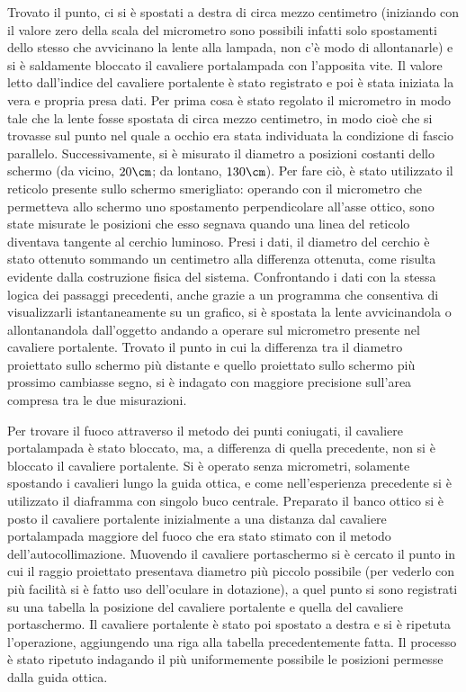 Trovato il punto, ci si è spostati a destra di circa mezzo centimetro (iniziando con il valore zero della scala del micrometro sono possibili infatti solo spostamenti dello stesso che avvicinano la lente alla lampada, non c'è modo di allontanarle) e si è saldamente bloccato il cavaliere portalampada con l'apposita vite. Il valore letto dall'indice del cavaliere portalente è stato registrato e poi è stata iniziata la vera e propria presa dati. Per prima cosa è stato regolato il micrometro in modo tale che la lente fosse spostata di circa mezzo centimetro, in modo cioè che si trovasse sul punto nel quale a occhio era stata individuata la condizione di fascio parallelo. Successivamente, si è misurato il diametro a posizioni costanti dello schermo (da vicino, $20\cm$; da lontano, $130\cm$).
Per fare ciò, è stato utilizzato il reticolo presente sullo schermo smerigliato: operando con il micrometro che permetteva allo schermo uno spostamento perpendicolare all'asse ottico, sono state misurate le posizioni che esso segnava quando una linea del reticolo diventava tangente al cerchio luminoso. Presi i dati, il diametro del cerchio \`e stato ottenuto sommando un centimetro alla differenza ottenuta, come risulta evidente dalla costruzione fisica del sistema. Confrontando i dati con la stessa logica dei passaggi precedenti, anche grazie a un programma che consentiva di visualizzarli istantaneamente su un grafico, si è spostata la lente avvicinandola o allontanandola dall'oggetto andando a operare sul micrometro presente nel cavaliere portalente. Trovato il punto in cui la differenza tra il diametro proiettato sullo schermo più distante e quello proiettato sullo schermo più prossimo cambiasse segno, si è indagato con maggiore precisione sull'area compresa tra le due misurazioni.


Per trovare il fuoco attraverso il metodo dei punti coniugati, il cavaliere portalampada \`e stato bloccato, ma, a differenza di quella precedente, non si è bloccato il cavaliere portalente. Si è operato senza micrometri, solamente spostando i cavalieri lungo la guida ottica, e come nell'esperienza precedente si è utilizzato il diaframma con singolo buco centrale. Preparato il banco ottico si è posto il cavaliere portalente inizialmente a una distanza dal cavaliere portalampada maggiore del fuoco che era stato stimato con il metodo dell'autocollimazione. Muovendo il cavaliere portaschermo si è cercato il punto in cui il raggio proiettato presentava diametro più piccolo possibile (per vederlo con più facilità si è fatto uso dell'oculare in dotazione), a quel punto si sono registrati su una tabella la posizione del cavaliere portalente e quella del cavaliere portaschermo. Il cavaliere portalente è stato poi spostato a destra e si è ripetuta l'operazione, aggiungendo una riga alla tabella precedentemente fatta. Il processo è stato ripetuto indagando il più uniformemente possibile le posizioni permesse dalla guida ottica.

